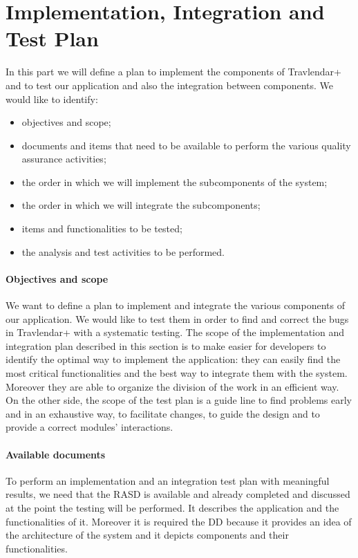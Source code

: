 \documentclass[12pt,titlepage]{article}
\begin{document}
\section{Implementation, Integration and Test Plan}
In this part we will define a plan to implement the components of Travlendar+ and to test our application and also the integration between components.
We would like to identify:
\begin{itemize}
\item objectives and scope;
\item documents and items that need to be available to perform the various quality assurance activities;
\item the order in which we will implement the subcomponents of the system;
\item the order in which we will integrate the subcomponents;
\item items and functionalities to be tested;
\item  the analysis and test activities to be performed.
\end{itemize}

\paragraph{Objectives and scope}
We want to define a plan to implement and integrate the various components of our application. We would like to test them in order to find and correct the bugs in Travlendar+ with a systematic testing.  
The scope of the implementation and integration plan described in this section is to make easier for developers to identify the optimal way to implement the application: they can easily find the most critical functionalities and the best way to integrate them with the system. Moreover they are able to organize the division of the work in an efficient way.
On the other side, the scope of the test plan is a guide line to find problems early and in an exhaustive way, to facilitate changes, to guide the design and to provide a correct modules' interactions.
\paragraph{Available documents}
To perform an implementation and an integration test plan with meaningful results, we need that the RASD is available and already completed and discussed at the point the testing will be performed. It describes the application and the functionalities of it.
Moreover it is required the DD because it provides an idea of the architecture of the system and it depicts components and their functionalities.
\end{document}
